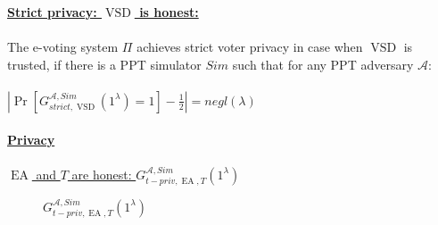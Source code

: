 \documentclass[12pt]{article}
\DeclareMathOperator{\vsd}{VSD}
\DeclareMathOperator{\ea}{EA}
\begin{document}
\underline{\textbf{Strict privacy: $\vsd$ is honest:}}\\\\
The e-voting system $\Pi$ achieves strict voter privacy in case when $\vsd$ is trusted, if there is a PPT simulator $Sim$ such that for any PPT adversary $\mathcal{A}$:\\\\
 $|\Pr[G_{strict,\vsd}^{\mathcal{A},Sim}(1^{\lambda}) = 1] - \frac{1}{2}| = negl(\lambda)$\\\\
\underline{\textbf{\large{Privacy}}}\\\\
 \underline{$\ea$ and $T$ are honest: $G_{t-priv,\ea,T}^{\mathcal{A}, Sim}(1^{\lambda})$}\\
  \begin{figure}
 
        \caption{  $G_{t-priv,\ea,T}^{\mathcal{A}, Sim}(1^{\lambda})$}
\end{figure}\\
 
\end{document}
